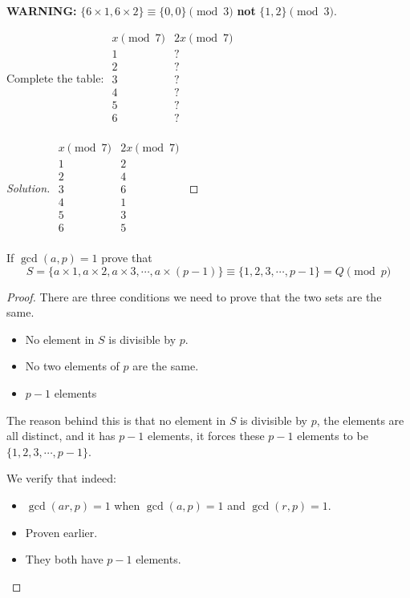 \documentclass[12pt,openany]{book}
\theoremstyle{definition}
\newenvironment{soln}{\begin{proof}[Solution]}{\end{proof}}
\theoremstyle{definition}
\begin{document}
\textbf{WARNING:}  $\{6\times 1, 6\times 2\}\equiv \{0,0\}\pmod{3}$ \textbf{not} $\{1,2\}\pmod{3}$. 

\begin{exmp}  Complete the table: 
$\begin{array}{c|c}
x\pmod{7} & 2x\pmod{7} \\ \hline
1 & ? \\ 
2 & ?\\
3 & ?\\
4 & ?\\
5 & ? \\
6 & ? \\
\end{array}$ \end{exmp}

\begin{soln}
$\begin{array}{c|c}
x\pmod{7} & 2x\pmod{7} \\ \hline
1 & 2 \\ 
2 & 4 \\
3 & 6\\
4 & 1\\
5 & 3 \\
6 & 5 \\
\end{array}$
\end{soln}

\begin{thm}  If $\gcd(a,p)=1$ prove that $$S=\{a\times 1, a\times 2, a\times 3, \cdots, a\times (p-1)\}\equiv \{1,2,3,\cdots, p-1\}=Q\pmod{p}$$ \end{thm}

\begin{proof}
There are three conditions we need to prove that the two sets are the same.
\begin{itemize}
\item  No element in $S$ is divisible by $p$.
\item  No two elements of $p$ are the same.
\item  $p-1$ elements
\end{itemize}

The reason behind this is that no element in $S$ is divisible by $p$, the elements are all distinct, and it has $p-1$ elements, it forces these $p-1$ elements to be $\{1,2,3,\cdots, p-1\}$.  

We verify that indeed:
\begin{itemize}
\item  $\gcd(ar, p)=1$ when $\gcd(a,p)=1$ and $\gcd(r,p)=1$.
\item  Proven earlier.  
\item  They both have $p-1$ elements.
\end{itemize}

\end{proof}
\end{document}
